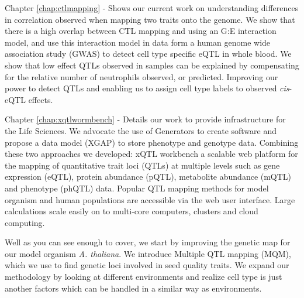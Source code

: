 Chapter \ref{chap:ctlmapping} -  Shows our current work on understanding differences in 
correlation observed when mapping two traits onto the genome. We show that there is a high 
overlap between CTL mapping and using an G:E interaction model, and use this interaction 
model in data form a human genome wide association study (GWAS) to detect cell type specific 
eQTL in whole blood. We show that low effect QTLs observed in samples can be explained by 
compensating for the relative number of neutrophils observed, or predicted. Improving our 
power to detect QTLs and enabling us to assign cell type labels to observed \emph{cis}-eQTL 
effects.

Chapter \ref{chap:xqtlwormbench} - Details our work to provide infrastructure for the Life 
Sciences. We advocate the use of Generators to create software and propose a data model (XGAP) 
to store phenotype and genotype data. Combining these two approaches we developed: xQTL 
workbench a scalable web platform for the mapping of quantitative trait loci (QTLs) at 
multiple levels such as gene expression (eQTL), protein abundance (pQTL), metabolite 
abundance (mQTL) and phenotype (phQTL) data. Popular QTL mapping methods for model organism 
and human populations are accessible via the web user interface. Large calculations scale 
easily on to multi-core computers, clusters and cloud computing.

Well as you can see enough to cover, we start by improving the genetic map for our model organism 
\emph{A. thaliana}. We introduce Multiple QTL mapping (MQM), which we use to find genetic loci 
involved in seed quality traits. We expand our methodology by looking at different environments 
and realize cell type is just another factors which can be handled in a similar way as environments.

